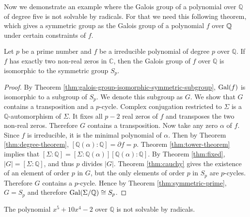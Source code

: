 Now we demonstrate an example where the Galois group of a polynomial over $\mathbb Q$ of degree five is not solvable by radicals. For that we need this following theorem, which gives a symmetric group as the Galois group of a polynomial $f$ over $\mathbb Q$ under certain constraints of $f$. 

\begin{theorem} \label{thm:galois-iso-symmetric}
	Let $p$ be a prime number and $f$ be a irreducible polynomial of degree $p$ over $\mathbb Q$. If $f$ has exactly two non-real zeros in $\mathbb C$, then the Galois group of $f$ over $\mathbb Q$ is isomorphic to the symmetric group $S_p$.
\end{theorem}

\begin{proof}
	By Theorem \ref{thm:galois-group-isomorphic-symmetric-subgroup}, $\operatorname{Gal}(f)$ is isomorphic to a subgroup of $S_p$. We denote this subgroup as $G$. We show that $G$ contains a transposition and a $p$-cycle. Complex conjugation restricted to $\Sigma$ is a $\mathbb Q$-automorphism of $\Sigma$. It fixes all $p - 2$ real zeros of $f$ and transposes the two non-real zeros. Therefore $G$ contains a transposition. Now
	take any zero $\alpha$ of $f$. Since $f$ is irreducible, it is the minimal polynomial of $\alpha$. Then by Theorem \ref{thm:degree-theorem}, $[\mathbb Q(\alpha) : \mathbb Q] = \partial f = p. $ Theorem \ref{thm:tower-theorem} implies that $[\Sigma : \mathbb Q] = [\Sigma : \mathbb Q(\alpha)] [ \mathbb Q(\alpha) : \mathbb Q]. $ By Theorem \ref{thm:fixed}, $|G| = [\Sigma : \mathbb Q]$, and thus $p$ divides $|G|$. Theorem \ref{thm:cauchy} gives the existence of an element of order $p$ in $G$, but the only elements of order $p$ in $S_p$ are $p$-cycles. Therefore $G$ contains a $p$-cycle. Hence by Theorem \ref{thm:symmetric-prime}, $ G = S_p$ and therefore $\operatorname{Gal}(\Sigma / \mathbb Q) \cong S_p$.
\end{proof}

\begin{example}
	The polynomial $x^5 + 10 x^4 - 2$ over $\mathbb Q$ is not solvable by radicals.
\end{example}

